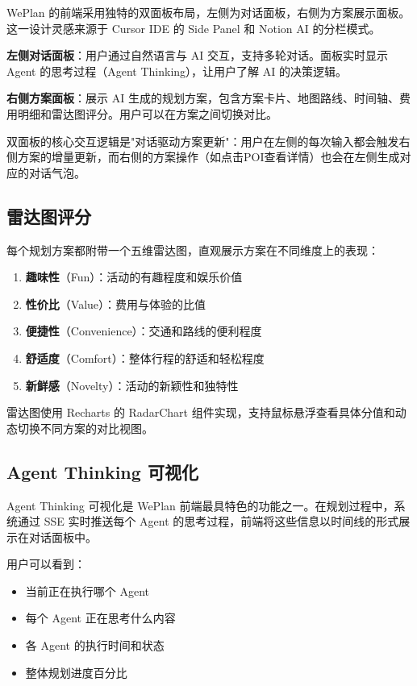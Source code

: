 \documentclass[12pt,a4paper]{ctexart}
\begin{document}
WePlan 的前端采用独特的双面板布局，左侧为对话面板，右侧为方案展示面板。这一设计灵感来源于 Cursor IDE 的 Side Panel 和 Notion AI 的分栏模式。

\textbf{左侧对话面板}：用户通过自然语言与 AI 交互，支持多轮对话。面板实时显示 Agent 的思考过程（Agent Thinking），让用户了解 AI 的决策逻辑。

\textbf{右侧方案面板}：展示 AI 生成的规划方案，包含方案卡片、地图路线、时间轴、费用明细和雷达图评分。用户可以在方案之间切换对比。

双面板的核心交互逻辑是"对话驱动方案更新"：用户在左侧的每次输入都会触发右侧方案的增量更新，而右侧的方案操作（如点击POI查看详情）也会在左侧生成对应的对话气泡。

\subsection{雷达图评分}

每个规划方案都附带一个五维雷达图，直观展示方案在不同维度上的表现：

\begin{enumerate}[leftmargin=2em]
  \item \textbf{趣味性}（Fun）：活动的有趣程度和娱乐价值
  \item \textbf{性价比}（Value）：费用与体验的比值
  \item \textbf{便捷性}（Convenience）：交通和路线的便利程度
  \item \textbf{舒适度}（Comfort）：整体行程的舒适和轻松程度
  \item \textbf{新鲜感}（Novelty）：活动的新颖性和独特性
\end{enumerate}

雷达图使用 Recharts 的 RadarChart 组件实现，支持鼠标悬浮查看具体分值和动态切换不同方案的对比视图。

\subsection{Agent Thinking 可视化}

Agent Thinking 可视化是 WePlan 前端最具特色的功能之一。在规划过程中，系统通过 SSE 实时推送每个 Agent 的思考过程，前端将这些信息以时间线的形式展示在对话面板中。

用户可以看到：
\begin{itemize}[leftmargin=2em]
  \item 当前正在执行哪个 Agent
  \item 每个 Agent 正在思考什么内容
  \item 各 Agent 的执行时间和状态
  \item 整体规划进度百分比
\end{itemize}
\end{document}
